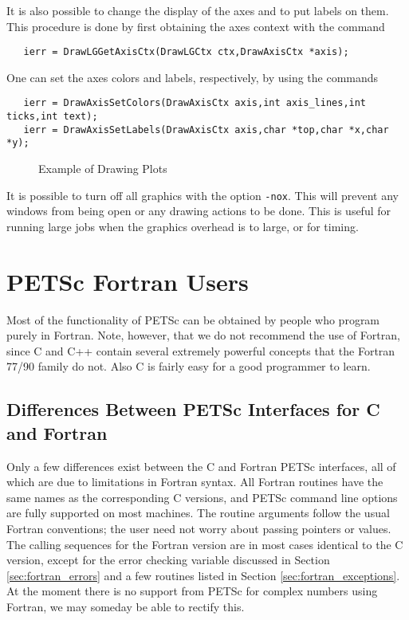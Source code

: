 It is also possible to change the display of the axes and to put labels 
on them. This procedure is done by first obtaining the axes context with the 
command  
\begin{verbatim}
   ierr = DrawLGGetAxisCtx(DrawLGCtx ctx,DrawAxisCtx *axis);
\end{verbatim}
One can set the axes colors and labels, respectively, by using the
commands  
\begin{verbatim}
   ierr = DrawAxisSetColors(DrawAxisCtx axis,int axis_lines,int ticks,int text);
   ierr = DrawAxisSetLabels(DrawAxisCtx axis,char *top,char *x,char *y);
\end{verbatim}

\begin{figure}[H]
{\small
{}
}
\caption{Example of Drawing Plots}
\end{figure}

It is possible to turn off all graphics with the option 
{\tt -nox}. This
will prevent any windows from being open or any drawing actions to be done.
This is useful for running large jobs when the graphics overhead is to 
large, or for timing.

\chapter{PETSc Fortran Users}

Most of the functionality of PETSc can be obtained by people who
program purely in Fortran.  Note, however, that we do not recommend the
use of Fortran, since C and C++ contain several extremely powerful
concepts that the Fortran 77/90 family do not.  Also C is fairly easy
for a good programmer to learn.

\section{Differences Between PETSc Interfaces for C and Fortran}

Only a few differences exist between the C and Fortran PETSc
interfaces, all of which are due to limitations in Fortran syntax.
All Fortran routines have the same names as the corresponding C
versions, and PETSc command line options are fully supported on most 
machines.  The
routine arguments follow the usual Fortran conventions; the user need
not worry about passing pointers or values.  The calling sequences
for the Fortran version are in most cases identical to the C version,
except for the error checking variable discussed in 
Section \ref{sec:fortran_errors} and a few routines listed in 
Section \ref{sec:fortran_exceptions}.
At the moment there is no support from PETSc for complex numbers using 
Fortran, we may someday be able to rectify this.

